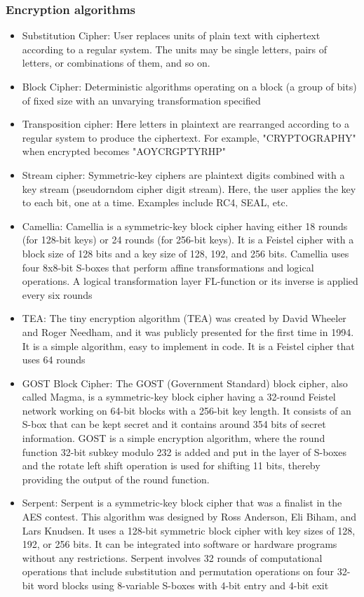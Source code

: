 \subsubsection{Encryption algorithms}
\begin{itemize}
    \item Substitution Cipher: User replaces units of plain text with ciphertext according to a regular system. The units may be single letters, pairs of letters, or combinations of them, and so on.
    \item Block Cipher: Deterministic algorithms operating on a block (a group of bits) of fixed size with an unvarying transformation specified
    \item Transposition cipher: Here letters in plaintext are rearranged according to a regular system to produce the ciphertext. For example, "CRYPTOGRAPHY" when encrypted becomes "AOYCRGPTYRHP"
    \item Stream cipher: Symmetric-key ciphers are plaintext digits combined with a key stream (pseudorndom cipher digit stream). Here, the user applies the key to each bit, one at a time. Examples include RC4, SEAL, etc.
    \item Camellia: Camellia is a symmetric-key block cipher having either 18 rounds (for 128-bit keys) or 24 rounds (for 256-bit keys). It is a Feistel cipher with a block size of 128 bits and a key size of 128, 192, and 256 bits. Camellia uses four 8x8-bit S-boxes that perform affine transformations and logical operations. A logical transformation layer FL-function or its inverse is applied every six rounds
    \item TEA: The tiny encryption algorithm (TEA) was created by David Wheeler and Roger Needham, and it was publicly presented for the first time in 1994. It is a simple algorithm, easy to implement in code. It is a Feistel cipher that uses 64 rounds
    \item GOST Block Cipher: The GOST (Government Standard) block cipher, also called Magma, is a symmetric-key block cipher having a 32-round Feistel network working on 64-bit blocks with a 256-bit key length. It consists of an S-box that can be kept secret and it contains around 354 bits of secret information. GOST is a simple encryption algorithm, where the round function 32-bit subkey modulo 232 is added and put in the layer of S-boxes and the rotate left shift operation is used for shifting 11 bits, thereby providing the output of the round function.
    \item Serpent: Serpent is a symmetric-key block cipher that was a finalist in the AES contest. This algorithm was designed by Ross Anderson, Eli Biham, and Lars Knudsen. It uses a 128-bit symmetric block cipher with key sizes of 128, 192, or 256 bits. It can be integrated into software or hardware programs without any restrictions. Serpent involves 32 rounds of computational operations that include substitution and permutation operations on four 32-bit word blocks using 8-variable S-boxes with 4-bit entry and 4-bit exit

\end{itemize}

